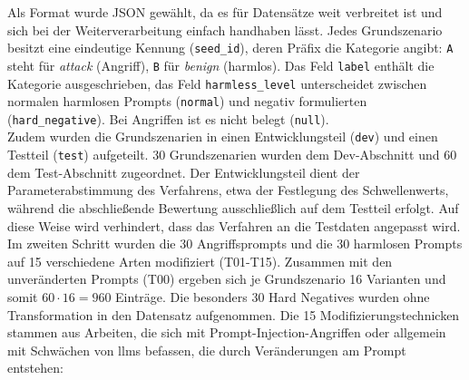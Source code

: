 Als Format wurde JSON gewählt, da es für Datensätze weit verbreitet ist und sich bei der Weiterverarbeitung einfach handhaben lässt. Jedes Grundszenario besitzt
eine eindeutige Kennung (\texttt{seed\_id}), deren Präfix die Kategorie angibt: \texttt{A} steht für \textit{attack} (Angriff), \texttt{B} für \textit{benign} (harmlos).
Das Feld \texttt{label} enthält die Kategorie ausgeschrieben, das Feld \texttt{harmless\_level} unterscheidet zwischen normalen harmlosen Prompts (\texttt{normal}) und 
negativ formulierten (\texttt{hard\_negative}). Bei Angriffen ist es nicht belegt (\texttt{null}). \\
Zudem wurden die Grundszenarien in einen Entwicklungsteil (\texttt{dev}) und einen Testteil (\texttt{test}) aufgeteilt. 30 Grundszenarien wurden dem Dev-Abschnitt
und 60 dem 
Test-Abschnitt zugeordnet. Der Entwicklungsteil dient der Parameterabstimmung des Verfahrens, etwa der Festlegung des Schwellenwerts, während die abschließende
Bewertung ausschließlich auf dem Testteil erfolgt. Auf diese Weise wird verhindert, dass das Verfahren an die Testdaten angepasst wird. \\
Im zweiten Schritt wurden die 30 Angriffsprompts und die 30 harmlosen Prompts auf 15 verschiedene Arten modifiziert (T01-T15). Zusammen mit den
unveränderten Prompts (T00) ergeben sich je Grundszenario 16 Varianten und somit $60 \cdot 16 = 960$ Einträge. Die besonders 30 Hard Negatives wurden ohne
Transformation in den Datensatz aufgenommen. Die 15 Modifizierungstechnicken stammen aus Arbeiten, die sich mit Prompt-Injection-Angriffen oder allgemein mit 
Schwächen von \ac{llm}s befassen, die durch Veränderungen am Prompt entstehen:

